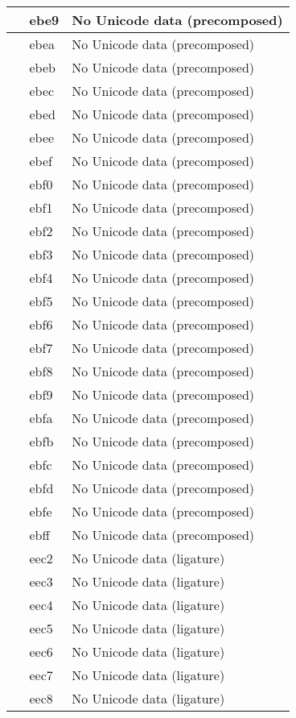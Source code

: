 \documentclass[12pt,letterpaper,openany]{book}
\begin{document}
\begin{center}
\begin{supertabular}{|m{0.25in}|m{0.5in}|m{4in}|}
 & ebe9 & No Unicode data (precomposed)\\\hline
 & ebea & No Unicode data (precomposed)\\\hline
 & ebeb & No Unicode data (precomposed)\\\hline
 & ebec & No Unicode data (precomposed)\\\hline
 & ebed & No Unicode data (precomposed)\\\hline
 & ebee & No Unicode data (precomposed)\\\hline
 & ebef & No Unicode data (precomposed)\\\hline
 & ebf0 & No Unicode data (precomposed)\\\hline
 & ebf1 & No Unicode data (precomposed)\\\hline
 & ebf2 & No Unicode data (precomposed)\\\hline
 & ebf3 & No Unicode data (precomposed)\\\hline
 & ebf4 & No Unicode data (precomposed)\\\hline
 & ebf5 & No Unicode data (precomposed)\\\hline
 & ebf6 & No Unicode data (precomposed)\\\hline
 & ebf7 & No Unicode data (precomposed)\\\hline
 & ebf8 & No Unicode data (precomposed)\\\hline
 & ebf9 & No Unicode data (precomposed)\\\hline
 & ebfa & No Unicode data (precomposed)\\\hline
 & ebfb & No Unicode data (precomposed)\\\hline
 & ebfc & No Unicode data (precomposed)\\\hline
 & ebfd & No Unicode data (precomposed)\\\hline
 & ebfe & No Unicode data (precomposed)\\\hline
 & ebff & No Unicode data (precomposed)\\\hline
 & eec2 & No Unicode data (ligature)\\\hline
 & eec3 & No Unicode data (ligature)\\\hline
 & eec4 & No Unicode data (ligature)\\\hline
 & eec5 & No Unicode data (ligature)\\\hline
 & eec6 & No Unicode data (ligature)\\\hline
 & eec7 & No Unicode data (ligature)\\\hline
 & eec8 & No Unicode data (ligature)\\\hline

\end{supertabular}
\end{center}
\end{document}
